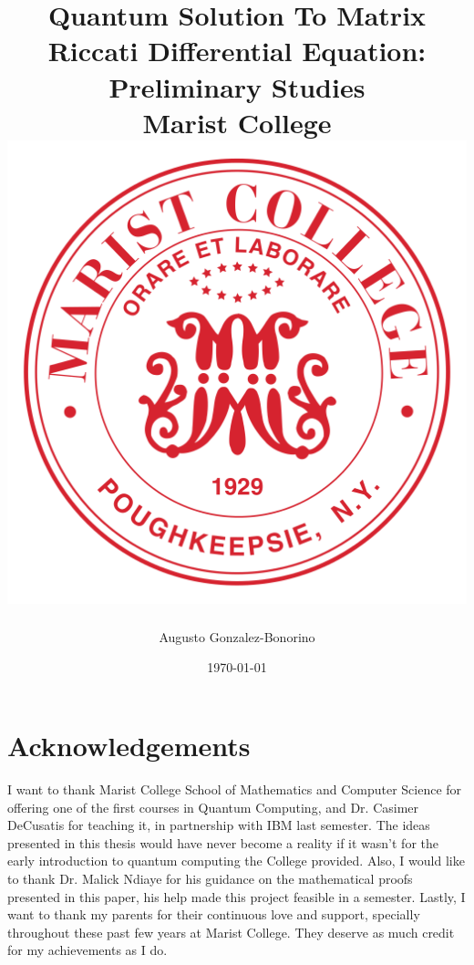 \documentclass[12pt]{report}
\title{
{Quantum Solution To Matrix Riccati Differential Equation: Preliminary Studies}\\
{\large Marist College}\\
\vspace{5mm}
{\includegraphics[scale=0.1]{images/Marist_College_Seal_-_Vector.svg_.png}}
}
\author{Augusto Gonzalez-Bonorino}
\date{\today}
\theoremstyle{named}
\begin{document}
\maketitle



\chapter*{Acknowledgements}
I want to thank Marist College School of Mathematics and Computer Science for offering one of the first courses in Quantum Computing, and Dr. Casimer DeCusatis for teaching it, in partnership with IBM last semester. The ideas presented in this thesis would have never become a reality if it wasn't for the early introduction to quantum computing the College provided. Also, I would like to thank Dr. Malick Ndiaye for his guidance on the mathematical proofs presented in this paper, his help made this project feasible in a semester. Lastly, I want to thank my parents for their continuous love and support, specially throughout these past few years at Marist College. They deserve as much credit for my achievements as I do.

\tableofcontents















\printbibliography


\end{document}
